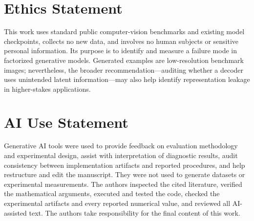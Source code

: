 \documentclass{article}
\begin{document}
\section*{Ethics Statement}

This work uses standard public computer-vision benchmarks and existing model
checkpoints, collects no new data, and involves no human subjects or sensitive
personal information.  Its purpose is to identify and measure a failure mode
in factorized generative models.  Generated examples are low-resolution
benchmark images; nevertheless, the broader recommendation---auditing whether
a decoder uses unintended latent information---may also help identify
representation leakage in higher-stakes applications.

\section*{AI Use Statement}

Generative AI tools were used to provide feedback on evaluation methodology
and experimental design, assist with interpretation of diagnostic results,
audit consistency between implementation artifacts and reported procedures,
and help restructure and edit the manuscript.  They were not used to generate
datasets or experimental measurements.  The authors inspected the cited
literature, verified the mathematical arguments, executed and tested the
code, checked the experimental artifacts and every reported numerical value,
and reviewed all AI-assisted text.  The authors take responsibility for the
final content of this work.

\clearpage



\appendix

\end{document}
